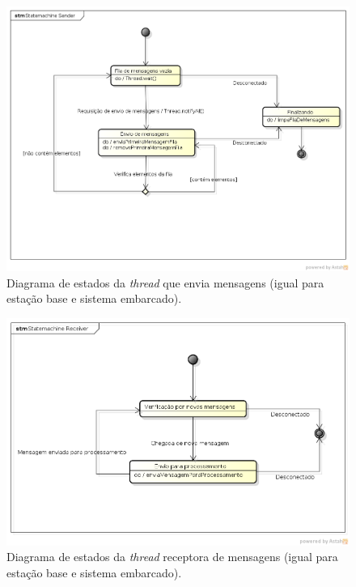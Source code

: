 \begin{figure}[H]
  \centering
  \includegraphics[width=\textwidth, keepaspectratio]{./figuras/diagrama_estados_sender.png}
  \caption{Diagrama de estados da \textit{thread} que envia mensagens (igual para estação base e sistema embarcado).}
  \label{fig:diagrama_estados_sender}
\end{figure}

\begin{figure}[H]
  \centering
  \includegraphics[width=\textwidth, keepaspectratio]{./figuras/diagrama_estados_receiver.png}
  \caption{Diagrama de estados da \textit{thread} receptora de mensagens (igual para estação base e sistema embarcado).}
  \label{fig:diagrama_estados_receiver}
\end{figure}

